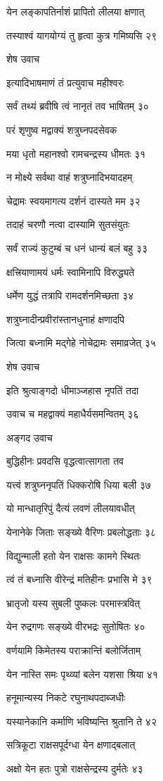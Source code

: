 येन लङ्कापतिर्नाशं प्रापितो लीलया क्षणात्

तस्याश्वं यागयोग्यं तु हृत्वा कुत्र गमिष्यसि २९

शेष उवाच

इत्यादिभाषमाणं तं प्रत्युवाच महीश्वरः

सर्वं तथ्यं ब्रवीषि त्वं नानृतं तव भाषितम् ३०

परं शृणुष्व मद्वाक्यं शत्रुघ्नपदसेवक

मया धृतो महानश्वो रामचन्द्रस्य धीमतः ३१

न मोक्ष्ये सर्वथा वाहं शत्रुघ्नादिभयादहम्

चेद्रामः स्वयमागत्य दर्शनं दास्यते मम ३२

तदाहं चरणौ नत्वा दास्यामि सुतसंयुतः

सर्वं राज्यं कुटुम्बं च धनं धान्यं बलं बहु ३३

क्षत्त्रियाणामयं धर्मः स्वामिनापि विरुद्ध्यते

धर्मेण युद्धं तत्रापि रामदर्शनमिच्छता ३४

शत्रुघ्नादीन्प्रवीरांस्तानधुनाहं क्षणादपि

जित्वा बध्नामि मद्गेहे नोचेद्रामः समाव्रजेत् ३५

शेष उवाच

इति श्रुत्वाङ्गदो धीमाञ्जहास नृपतिं तदा

उवाच च महद्वाक्यं महाधैर्यसमन्वितम् ३६

अङ्गद उवाच

बुद्धिहीनः प्रवदसि वृद्धत्वात्सागता तव

यत्त्वं शत्रुघ्ननृपतिं धिक्करोषि धिया बली ३७

यो मान्धातृरिपुं दैत्यं लवणं लीलयावधीत्

येनानेके जिताः सङ्ख्ये वैरिणः प्रबलोद्धताः ३८

विद्युन्माली हतो येन राक्षसः कामगे स्थितः

त्वं तं बध्नासि वीरेन्द्रं मतिहीनः प्रभासि मे ३९

भ्रातृजो यस्य सुबली पुष्कलः परमास्त्रवित्

येन रुद्रगणः सङ्ख्ये वीरभद्रः सुतोषितः ४०

वर्णयामि किमेतस्य पराक्रान्तिं बलोर्जिताम्

येन नास्ति समः पृथ्व्यां बलेन यशसा श्रिया ४१

हनूमान्यस्य निकटे रघुनाथपदाब्जधीः

यस्यानेकानि कर्माणि भविष्यन्ति श्रुतानि ते ४२

सत्रिकूटा राक्षसपूर्दग्धा येन क्षणाद्बलात्

अक्षो येन हतः पुत्रो राक्षसेन्द्रस्य दुर्मतेः ४३

